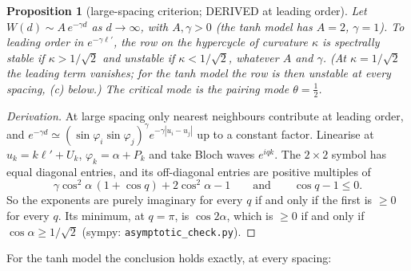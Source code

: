 \documentclass[11pt]{article}
\newtheorem{proposition}[theorem]{Proposition}
\theoremstyle{remark}
\begin{document}
\begin{proposition}[large-spacing criterion; DERIVED at leading order]\label{prop:kappac}
Let $W(d)\sim A\,e^{-\gamma d}$ as $d\to\infty$, with $A,\gamma>0$ (the tanh model has $A=2$, $\gamma=1$). To leading order in
$e^{-\gamma\ell'}$, the row on the hypercycle of curvature $\kappa$ is spectrally stable if $\kappa>1/\sqrt2$ and unstable if
$\kappa<1/\sqrt2$, whatever $A$ and $\gamma$. (At $\kappa=1/\sqrt2$ the leading term vanishes; for the tanh model the row is then
unstable at every spacing, (c) below.) The critical mode is the pairing mode $\theta=\frac12$.
\end{proposition}
\begin{proof}[Derivation]
At large spacing only nearest neighbours contribute at leading order, and $e^{-\gamma d}\simeq(\sin\varphi_i\sin\varphi_j)^\gamma
e^{-\gamma|u_i-u_j|}$ up to a constant factor. Linearise at $u_k=k\ell'+U_k$, $\varphi_k=\alpha+P_k$ and take Bloch waves
$e^{iqk}$. The $2\times2$ symbol has equal diagonal entries, and its off-diagonal entries are positive multiples of
\[
\gamma\cos^2\!\alpha\,(1+\cos q)+2\cos^2\!\alpha-1\qquad\text{and}\qquad \cos q-1\le0 .
\]
So the exponents are purely imaginary for every $q$ if and only if the first is $\ge0$ for every $q$. Its minimum, at
$q=\pi$, is $\cos2\alpha$, which is $\ge0$ if and only if $\cos\alpha\ge1/\sqrt2$ (sympy: \texttt{asymptotic\_check.py}).
\end{proof}
For the tanh model the conclusion holds exactly, at every spacing:
\end{document}
